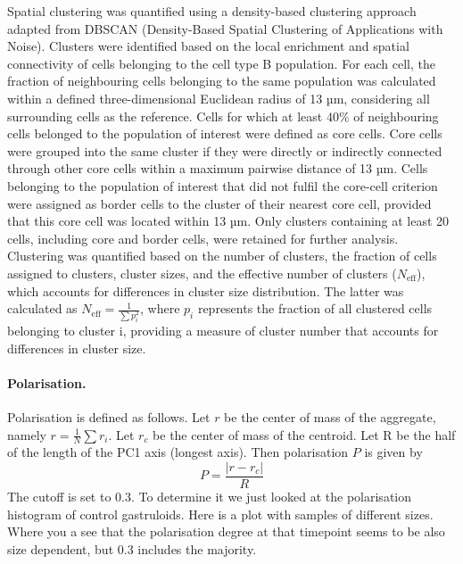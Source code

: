\documentclass{article}
\begin{document}
    Spatial clustering was quantified using a density-based clustering approach adapted from DBSCAN (Density-Based Spatial Clustering of Applications with Noise). Clusters were identified based on the local enrichment and spatial connectivity of cells belonging to the cell type B population. For each cell, the fraction of neighbouring cells belonging to the same population was calculated within a defined three-dimensional Euclidean radius of 13 µm, considering all surrounding cells as the reference. Cells for which at least $40\%$ of neighbouring cells belonged to the population of interest were defined as core cells. Core cells were grouped into the same cluster if they were directly or indirectly connected through other core cells within a maximum pairwise distance of 13 µm. Cells belonging to the population of interest that did not fulfil the core-cell criterion were assigned as border cells to the cluster of their nearest core cell, provided that this core cell was located within 13 µm. Only clusters containing at least 20 cells, including core and border cells, were retained for further analysis. Clustering was quantified based on the number of clusters, the fraction of cells assigned to clusters, cluster sizes, and the effective number of clusters ($N_\text{eff}$), which accounts for differences in cluster size distribution. The latter was calculated as $N_\text{eff} = \frac{1}{\sum p_i ^2}$, where $p_i$ represents the fraction of all clustered cells belonging to cluster i, providing a measure of cluster number that accounts for differences in cluster size.

\paragraph{Polarisation.}

    Polarisation is defined as follows. Let $r$ be the center of mass of the aggregate, namely $r = \frac{1}{N} \sum r_i$. Let $r_c$ be the center of mass of the centroid. Let R be the half of the length of the PC1 axis (longest axis). Then polarisation $P$ is given by 
    \begin{equation*}
        P = \frac{|r - r_c|}{R}
    \end{equation*}
    The cutoff is set to 0.3. To determine it we just looked at the polarisation histogram of control gastruloids. Here is a plot with samples of different sizes. Where you a see that the polarisation degree at that timepoint seems to be also size dependent, but 0.3 includes the majority. 
\end{document}
